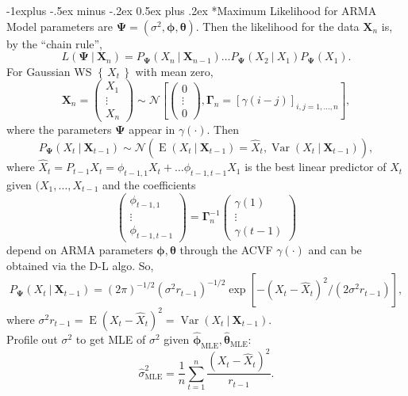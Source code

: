 \documentclass[paper=a4,fontsize=2.89mm]{scrartcl}
\makeatletter
\DeclareMathOperator{\Var}{Var}
\DeclareMathOperator{\E}{E}
\newcommand\given[1][]{\:#1\vert\:}
\newcommand\set[1]{\left\{\, #1 \,\right\}}
\newcommand{\bphi}{\boldsymbol{\phi}}
\newcommand{\btheta}{\boldsymbol{\theta}}
\newcommand{\bGamma}{\boldsymbol{\Gamma}}
\renewcommand{\subsection}{\@startsection{subsection}{2}{0mm}%
                                {-1explus -.5ex minus -.2ex}%
                                {0.5ex plus .2ex}%
                                {\normalfont\normalsize\bfseries}}
\makeatother
\begin{document}
\begin{multicols}{3}
\subsection*{Maximum Likelihood for ARMA}
Model parameters are $\boldsymbol{\Psi} = (\sigma^2, \bphi, \btheta)$. Then the likelihood for the data $\mathbf{X}_n$ is, by the ``chain rule'',
$$L(\boldsymbol{\Psi}\given\mathbf{X}_n) = P_{\boldsymbol{\Psi}}(X_n\given\mathbf{X}_{n-1}) \dots P_{\boldsymbol{\Psi}}(X_2\given X_1)P_{\boldsymbol{\Psi}}(X_1).$$
For Gaussian WS $\set{X_t}$ with mean zero,
$$\mathbf{X}_n = \begin{pmatrix}X_1 \\ \vdots \\ X_n\end{pmatrix} \sim \mathcal{N}\left[ 
\begin{pmatrix}0 \\ \vdots \\ 0\end{pmatrix},
\bGamma_n = [\gamma(i-j)]_{i,j=1,\dots,n}
\right],$$
where the parameters $\boldsymbol{\Psi}$ appear in $\gamma(\cdot)$. Then
$$P_{\boldsymbol{\Psi}}(X_t\given\mathbf{X}_{t-1})  \sim \mathcal{N}\left(\E(X_t \given \mathbf{X}_{t-1}) = \hat{X}_t, \Var(X_t \given \mathbf{X}_{t-1})\right),$$
where $\hat{X}_t = P_{t-1}X_t = \phi_{t-1,1}X_t + \dots \phi_{t-1,t-1}X_1$ is the best linear predictor of $X_t$ given $(X_1, \dots, X_{t-1}$ and the coefficients
$$\begin{pmatrix} \phi_{t-1,1} \\ \vdots \\ \phi_{t-1,t-1}\end{pmatrix} = \bGamma_n^{-1}\begin{pmatrix} \gamma(1) \\ \vdots \\ \gamma(t-1) \end{pmatrix}$$
depend on ARMA parameters $\bphi, \btheta$ through the ACVF $\gamma(\cdot)$ and can be obtained via the D-L algo. So,
$$P_{\boldsymbol{\Psi}}(X_t\given\mathbf{X}_{t-1})  = (2\pi)^{-1/2}(\sigma^2 r_{t-1})^{-1/2}\exp\left[ -(X_t-\hat{X}_t)^2/(2\sigma^2r_{t-1})\right],$$
where $\sigma^2r_{t-1} = \E(X_t-\hat{X}_t)^2 = \Var(X_t\given\mathbf{X}_{t-1})$. \\
Profile out $\sigma^2$ to get MLE of $\sigma^2$ given $\hat{\bphi}_\text{MLE}, \hat{\btheta}_\text{MLE}$:
$$\hat{\sigma}^2_\text{MLE} = \frac{1}{n} \sum_{t=1}^n \frac{(X_t-\hat{X}_t)^2}{r_{t-1}}.$$



\end{multicols}
\end{document}
